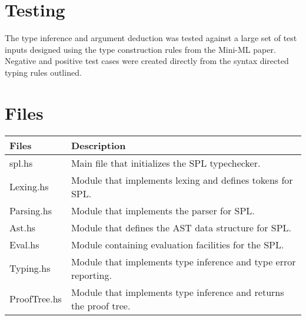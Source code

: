\documentclass{article}
\begin{document}
\begin{prooftree}
\end{prooftree}

\begin{prooftree}
\end{prooftree}

\section{Testing}

The type inference and argument deduction was tested against a large set of 
test inputs designed using the type construction rules from the Mini-ML paper.
Negative and positive test cases were created directly from the syntax directed
typing rules outlined.

\section{Files}
\begin{tabular}{|p{20mm}|p{93mm}|}
  \hline
{\bf Files}&{\bf Description}\\
  \hline
spl.hs & Main file that initializes the SPL typechecker.\\
  \hline
Lexing.hs & Module that implements lexing and defines tokens for SPL.\\
  \hline
Parsing.hs & Module that implements the parser for SPL.\\
  \hline
Ast.hs & Module that defines the AST data structure for SPL.\\
  \hline
Eval.hs & Module containing evaluation facilities for the SPL.\\
  \hline
Typing.hs & Module that implements type inference and type error reporting.\\
  \hline
ProofTree.hs & Module that implements type inference and returns the proof tree.\\
  \hline
\end{tabular}
\end{document}
